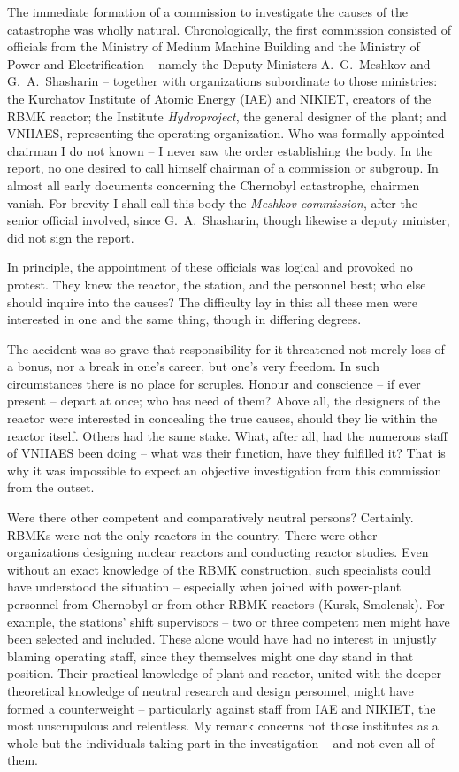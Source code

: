 \documentclass[openright]{bookest}
\begin{document}
The immediate formation of a commission to investigate the causes of the catastrophe was wholly natural. Chronologically, the first commission consisted of officials from the Ministry of Medium Machine Building and the Ministry of Power and Electrification -- namely the Deputy Ministers A.~G.~Meshkov and G.~A.~Shasharin -- together with organizations subordinate to those ministries: the Kurchatov Institute of Atomic Energy (IAE) and NIKIET, creators of the RBMK reactor; the Institute \textit{Hydroproject}, the general designer of the plant; and VNIIAES, representing the operating organization. Who was formally appointed chairman I do not known -- I never saw the order establishing the body. In the report, no one desired to call himself chairman of a commission or subgroup. In almost all early documents concerning the Chernobyl catastrophe, chairmen vanish. For brevity I shall call this body the \textit{Meshkov commission}, after the senior official involved, since G.~A.~Shasharin, though likewise a deputy minister, did not sign the report.

In principle, the appointment of these officials was logical and provoked no protest. They knew the reactor, the station, and the personnel best; who else should inquire into the causes? The difficulty lay in this: all these men were interested in one and the same thing, though in differing degrees.

The accident was so grave that responsibility for it threatened not merely loss of a bonus, nor a break in one's career, but one's very freedom. In such circumstances there is no place for scruples. Honour and conscience -- if ever present -- depart at once; who has need of them? Above all, the designers of the reactor were interested in concealing the true causes, should they lie within the reactor itself. Others had the same stake. What, after all, had the numerous staff of VNIIAES been doing -- what was their function, have they fulfilled it? That is why it was impossible to expect an objective investigation from this commission from the outset.


Were there other competent and comparatively neutral persons? Certainly. RBMKs were not the only reactors in the country. There were other organizations designing nuclear reactors and conducting reactor studies. Even without an exact knowledge of the RBMK construction, such specialists could have understood the situation -- especially when joined with power-plant personnel from Chernobyl or from other RBMK reactors (Kursk, Smolensk). For example, the stations' shift supervisors -- two or three competent men might have been selected and included. These alone would have had no interest in unjustly blaming operating staff, since they themselves might one day stand in that position. Their practical knowledge of plant and reactor, united with the deeper theoretical knowledge of neutral research and design personnel, might have formed a counterweight -- particularly against staff from IAE and NIKIET, the most unscrupulous and relentless. My remark concerns not those institutes as a whole but the individuals taking part in the investigation -- and not even all of them.
\end{document}

